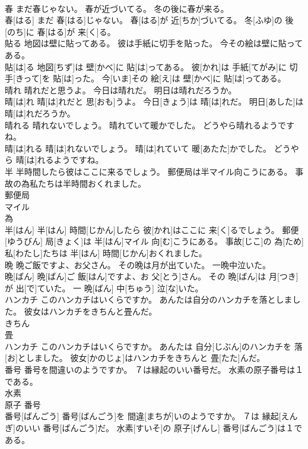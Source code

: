 \documentclass[8pt]{extreport}
\begin{document}
\begin{CJK}{UTF8}{min}
\\	春 まだ春じゃない。 春が近づいてる。 冬の後に春が来る。	
\\	春[はる] まだ 春[はる]じゃない。 春[はる]が 近[ちか]づいてる。 冬[ふゆ]の 後[のち]に 春[はる]が 来[く]る。
\\	貼る 地図は壁に貼ってある。 彼は手紙に切手を貼った。 今その絵は壁に貼ってある。	
\\	貼[は]る 地図[ちず]は 壁[かべ]に 貼[は]ってある。 彼[かれ]は 手紙[てがみ]に 切手[きって]を 貼[は]った。 今[いま]その 絵[え]は 壁[かべ]に 貼[は]ってある。
\\	晴れ 晴れだと思うよ。 今日は晴れだ。 明日は晴れだろうか。	
\\	晴[は]れ 晴[は]れだと 思[おも]うよ。 今日[きょう]は 晴[は]れだ。 明日[あした]は 晴[は]れだろうか。
\\	晴れる 晴れないでしょう。 晴れていて暖かでした。 どうやら晴れるようですね。	
\\	晴[は]れる 晴[は]れないでしょう。 晴[は]れていて 暖[あたた]かでした。 どうやら 晴[は]れるようですね。
\\	半 半時間したら彼はここに来るでしょう。 郵便局は半マイル向こうにある。 事故の為私たちは半時間おくれました。	
\\	郵便局 
\\	マイル 
\\	為 
\\	半[はん] 半[はん] 時間[じかん]したら 彼[かれ]はここに 来[く]るでしょう。 郵便[ゆうびん] 局[きょく]は 半[はん]マイル 向[む]こうにある。 事故[じこ]の 為[ため] 私[わたし]たちは 半[はん] 時間[じかん]おくれました。
\\	晩 晩ご飯ですよ、お父さん。 その晩は月が出ていた。 一晩中泣いた。	
\\	晩[ばん] 晩[ばん]ご 飯[はん]ですよ、お 父[とう]さん。 その 晩[ばん]は 月[つき]が 出[で]ていた。 一 晩[ばん] 中[ちゅう] 泣[な]いた。
\\	ハンカチ このハンカチはいくらですか。 あんたは自分のハンカチを落としました。 彼女はハンカチをきちんと畳んだ。	
\\	きちん 
\\	畳 
\\	ハンカチ このハンカチはいくらですか。 あんたは 自分[じぶん]のハンカチを 落[お]としました。 彼女[かのじょ]はハンカチをきちんと 畳[たた]んだ。
\\	番号 番号を間違いのようですか。 ７は縁起のいい番号だ。 水素の原子番号は１である。	
\\	水素 
\\	原子 番号 
\\	番号[ばんごう] 番号[ばんごう]を 間違[まちが]いのようですか。 ７は 縁起[えんぎ]のいい 番号[ばんごう]だ。 水素[すいそ]の 原子[げんし] 番号[ばんごう]は１である。

\end{CJK}
\end{document}
